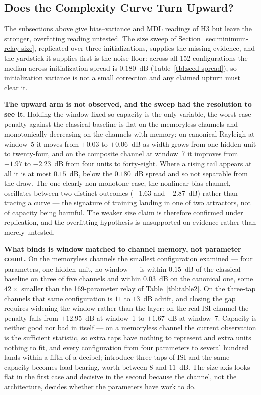 \subsection{Does the Complexity Curve Turn Upward?}\label{sec:complexity-curve-turn}

The subsections above give bias--variance and MDL readings of H3 but leave the stronger, overfitting reading
untested. The size sweep of Section~\ref{sec:minimum-relay-size}, replicated over three initializations,
supplies the missing evidence, and the yardstick it supplies first is the noise floor: across all 152
configurations the median across-initialization spread is $0.180$~dB (Table~\ref{tbl:seed-spread}), so
initialization variance is not a small correction and any claimed upturn must clear it.

\textbf{The upward arm is not observed, and the sweep had the resolution to see it.} Holding the window fixed
so capacity is the only variable, the worst-case penalty against the classical baseline is flat on the
memoryless channels and monotonically decreasing on the channels with memory: on canonical Rayleigh at
window~5 it moves from $+0.03$ to $+0.06$~dB as width grows from one hidden unit to twenty-four, and on the
composite channel at window~7 it improves from $-1.97$ to $-2.23$~dB from four units to forty-eight. Where a
rising tail appears at all it is at most $0.15$~dB, below the $0.180$~dB spread and so not separable from the
draw. The one clearly non-monotone case, the nonlinear-bias channel, oscillates between two distinct outcomes
($-1.63$ and $-2.87$~dB) rather than tracing a curve --- the signature of training landing in one of two
attractors, not of capacity being harmful. The weaker size claim is therefore confirmed under replication,
and the overfitting hypothesis is unsupported on evidence rather than merely untested.

\textbf{What binds is window matched to channel memory, not parameter count.} On the memoryless channels the
smallest configuration examined --- four parameters, one hidden unit, no window --- is within $0.15$~dB of the
classical baseline on three of five channels and within $0.03$~dB on the canonical one, some $42\times$
smaller than the 169-parameter relay of Table~\ref{tbl:table2}. On the three-tap channels that same
configuration is $11$ to $13$~dB adrift, and closing the gap requires widening the window rather than the
layer: on the real ISI channel the penalty falls from $+12.95$~dB at window~1 to $+1.67$~dB at window~7.
Capacity is neither good nor bad in itself --- on a memoryless channel the current observation is the
sufficient statistic, so extra taps have nothing to represent and extra units nothing to fit, and every
configuration from four parameters to several hundred lands within a fifth of a decibel; introduce three taps
of ISI and the same capacity becomes load-bearing, worth between $8$ and $11$~dB. The size axis looks flat in
the first case and decisive in the second because the channel, not the architecture, decides whether the
parameters have work to do.

